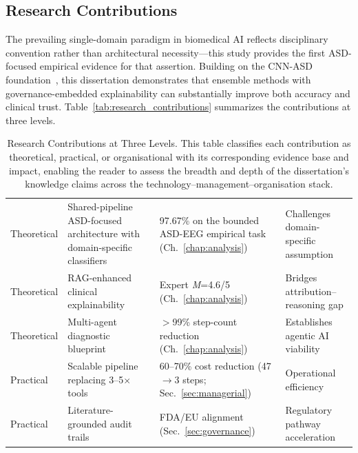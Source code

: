 \subsection{Research Contributions}

The prevailing single-domain paradigm in biomedical AI reflects disciplinary convention rather than architectural necessity---this study provides the first ASD-focused empirical evidence for that assertion. Building on the CNN-ASD foundation~\cite{asthana2025cnnasd_icsit}, this dissertation demonstrates that ensemble methods with governance-embedded explainability can substantially improve both accuracy and clinical trust. Table~\ref{tab:research_contributions} summarizes the contributions at three levels.

\begin{table}[!htbp]
\tablestripes\tablefontsize
\tablefontsize
\caption[Research Contributions at Three Levels]{Research Contributions at Three Levels. This table classifies each contribution as theoretical, practical, or organisational with its corresponding evidence base and impact, enabling the reader to assess the breadth and depth of the dissertation's knowledge claims across the technology--management--organisation stack.}
\begin{tabularx}{\textwidth}{@{} >{\raggedright\arraybackslash}p{1.5cm} L L >{\raggedright\arraybackslash}p{1.8cm} @{}}
\toprule
{} &  &  &  \\
\midrule
Theoretical & Shared-pipeline ASD-focused architecture with domain-specific classifiers & 97.67\% on the bounded ASD-EEG empirical task (Ch.~\ref{chap:analysis}) & Challenges domain-specific assumption \\
\addlinespace
Theoretical & RAG-enhanced clinical explainability & Expert \textit{M}=4.6/5 (Ch.~\ref{chap:analysis}) & Bridges attribution--reasoning gap \\
\addlinespace
Theoretical & Multi-agent diagnostic blueprint & $>$99\% step-count reduction (Ch.~\ref{chap:analysis}) & Establishes agentic AI viability \\
\addlinespace
Practical & Scalable pipeline replacing 3--5$\times$ tools & 60--70\% cost reduction (47$\to$3 steps; Sec.~\ref{sec:managerial}) & Operational efficiency \\
\addlinespace
Practical & Literature-grounded audit trails & FDA/EU alignment (Sec.~\ref{sec:governance}) & Regulatory pathway acceleration \\

\end{tabularx}
\end{table}
